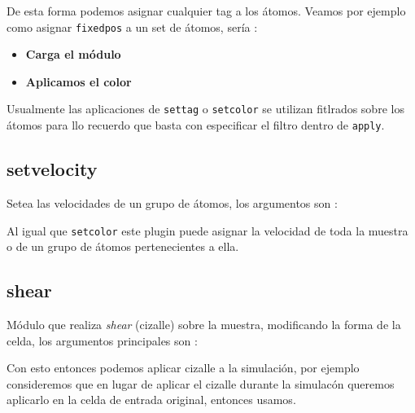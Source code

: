 De esta forma podemos asignar cualquier tag a los \'atomos. Veamos por ejemplo como asignar \verb|fixedpos| a un set de \'atomos, ser\'ia :

\begin{itemize}
 \item \textbf{Carga el m\'odulo}
 \item \textbf{Aplicamos el color}
\end{itemize}

Usualmente las aplicaciones de \verb|settag| o \verb|setcolor| se utilizan fitlrados sobre los \'atomos para llo recuerdo que basta con especificar el filtro dentro de \verb|apply|.

\subsection{setvelocity}
Setea las velocidades de un grupo de \'atomos, los argumentos son :


Al igual que \verb|setcolor| este plugin puede asignar la velocidad de toda la muestra o de un grupo de \'atomos pertenecientes a ella.

\subsection{shear}
M\'odulo que realiza \textit{shear} (cizalle) sobre la muestra, modificando la forma de la celda, los argumentos principales son :


Con esto entonces podemos aplicar cizalle a la simulaci\'on, por ejemplo consideremos que en lugar de aplicar el cizalle durante la simulac\'on queremos aplicarlo en la celda de entrada original, entonces usamos.

